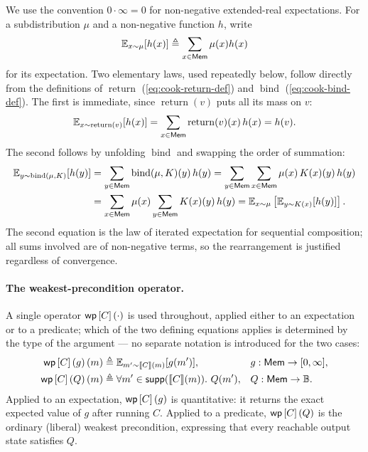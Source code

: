 \documentclass[acmsmall,natbib,review,screen,anonymous,10pt]{acmart}
\begin{document}
We use the convention $0\cdot\infty=0$ for non-negative extended-real
expectations.
For a subdistribution $\mu$ and a non-negative function $h$, write
\begin{equation}
  \mathbb E_{x\sim\mu}[h(x)]\triangleq\sum_{x\in\mathsf{Mem}}\mu(x)h(x)
  \label{eq:cook-expect-def}
\end{equation}
for its expectation. Two elementary laws, used repeatedly below, follow directly
from the definitions of $\operatorname{return}$
(\ref{eq:cook-return-def}) and $\operatorname{bind}$
(\ref{eq:cook-bind-def}). The first is immediate, since
$\operatorname{return}(v)$ puts all its mass on $v$:
\begin{equation}
  \mathbb E_{x\sim\operatorname{return}(v)}[h(x)]
    =\sum_{x\in\mathsf{Mem}}\operatorname{return}(v)(x)\,h(x)
    =h(v).
  \label{eq:cook-expect-return}
\end{equation}
The second follows by unfolding $\operatorname{bind}$ and swapping the
order of summation:
\begin{align}
  \mathbb E_{y\sim\operatorname{bind}(\mu,K)}[h(y)]
    &=\sum_{y\in\mathsf{Mem}}\operatorname{bind}(\mu,K)(y)\,h(y)
    =\sum_{y\in\mathsf{Mem}}\sum_{x\in\mathsf{Mem}}\mu(x)\,K(x)(y)\,h(y)\\
    &=\sum_{x\in\mathsf{Mem}}\mu(x)\sum_{y\in\mathsf{Mem}}K(x)(y)\,h(y)
    =\mathbb E_{x\sim\mu}
       \left[\mathbb E_{y\sim K(x)}[h(y)]\right].
  \label{eq:cook-expect-bind}
\end{align}
The second equation is the law of iterated expectation for sequential
composition; all sums involved are of non-negative terms, so the
rearrangement is justified regardless of convergence.

\paragraph{The weakest-precondition operator.}
A single operator $\mathsf{wp}\left[{C}\right]\left({\cdot}\right)$ is used throughout, applied either to an
expectation or to a predicate; which of the two defining equations applies
is determined by the type of the argument --- no separate notation is
introduced for the two cases:
\begin{align}
  \mathsf{wp}\left[{C}\right]\left({g}\right)(m)
    &\triangleq
      \mathbb E_{m'\sim\llbracket C\rrbracket(m)}[g(m')],
    &&g:\mathsf{Mem}\to[0,\infty],
  \label{eq:cook-wp-definition}\\
  \mathsf{wp}\left[{C}\right]\left({Q}\right)(m)
    &\triangleq
      \forall m'\in\mathsf{supp}(\llbracket C\rrbracket(m)).\ Q(m'),
    &&Q:\mathsf{Mem}\to\mathbb{B}.
  \label{eq:cook-gwp-definition}
\end{align}
Applied to an expectation, $\mathsf{wp}\left[{C}\right]\left({g}\right)$ is quantitative: it returns the exact
expected value of $g$ after running $C$. Applied to a predicate, $\mathsf{wp}\left[{C}\right]\left({Q}\right)$
is the ordinary (liberal) weakest precondition, expressing that every
reachable output state satisfies $Q$.
\end{document}
